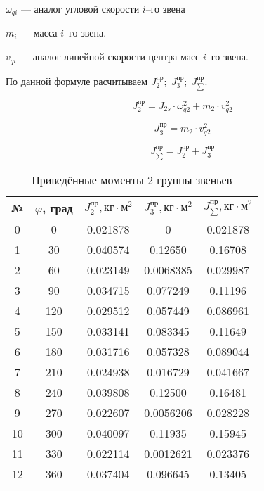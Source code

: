 $ \omega_{qi} $ --- аналог угловой скорости $ i $--го звена

$ m_i $ --- масса $ i $--го звена.

$  v_{qi} $ --- аналог линейной скорости центра масс $ i $--го звена.

По данной формуле расчитываем $J_2^{пр}; \; J_3^{пр}; \; J_{\sum}^{пр}$.

\begin{equation}
	J_2^{пр} = J_{2s} \cdot \omega_{q2}^2 + m_2 \cdot v_{q2}^2
\end{equation}

\begin{equation}
J_3^{пр} = m_2 \cdot v_{q2}^2
\end{equation}

\begin{equation}
J_{\sum}^{пр} = J_2^{пр} + J_3^{пр}
\end{equation}

\begin{table}
\caption{Приведённые моменты 2 группы звеньев}
\begin{tabular}{|c|c|c|c|c|}
	\hline 
	№ & $\varphi$, град & $J_2^{пр}, кг \cdot м^2$ &  $J_3^{пр}, кг \cdot м^2$ &  $J_{\sum}^{пр}, кг \cdot м^2$ \\ 
	\hline
	0  &    0 &  0.021878 &          0 &  0.021878 \\
	\hline
	1  &   30 &  0.040574 &    0.12650 &   0.16708 \\
	\hline
	2  &   60 &  0.023149 &  0.0068385 &  0.029987 \\
	\hline
	3  &   90 &  0.034715 &   0.077249 &   0.11196 \\
	\hline
	4  &  120 &  0.029512 &   0.057449 &  0.086961 \\
	\hline
	5  &  150 &  0.033141 &   0.083345 &   0.11649 \\
	\hline
	6  &  180 &  0.031716 &   0.057328 &  0.089044 \\
	\hline
	7  &  210 &  0.024938 &   0.016729 &  0.041667 \\
	\hline
	8  &  240 &  0.039808 &    0.12500 &   0.16481 \\
	\hline
	9  &  270 &  0.022607 &  0.0056206 &  0.028228 \\
	\hline
	10 &  300 &  0.040097 &    0.11935 &   0.15945 \\
	\hline
	11 &  330 &  0.022114 &  0.0012621 &  0.023376 \\
	\hline
	12 &  360 &  0.037404 &   0.096645 &   0.13405 \\
	\hline
	
\end{tabular} 
\end{table}

